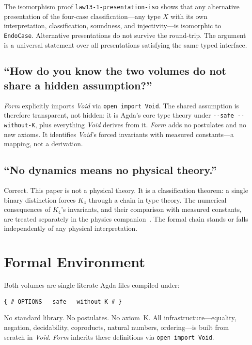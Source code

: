 \documentclass[11pt,a4paper]{article}
\theoremstyle{definition}
\begin{document}
The isomorphism proof \texttt{law13-1-presentation-iso} shows that any
alternative presentation of the four-case classification---any type $X$ with its
own interpretation, classification, soundness, and injectivity---is isomorphic
to \texttt{EndoCase}.  Alternative presentations do not survive the round-trip.
The argument is a universal statement over all presentations satisfying the
same typed interface.

\subsection*{``How do you know the two volumes do not share a hidden assumption?''}

\textit{Form} explicitly imports \textit{Void} via \texttt{open import Void}.
The shared assumption is therefore transparent, not hidden: it is
Agda's core type theory under \texttt{-{}-safe -{}-without-K}, plus
everything \textit{Void} derives from it.  \textit{Form} adds no postulates
and no new axioms.  It identifies \textit{Void}'s forced invariants with
measured constants---a mapping, not a derivation.

\subsection*{``No dynamics means no physical theory.''}

Correct.  This paper is not a physical theory.  It is a classification
theorem: a single binary distinction forces $K_4$ through a chain
in type theory.  The numerical consequences of $K_4$'s invariants, and their
comparison with measured constants, are treated separately in the physics
companion~\cite{wielsch2026physics}.  The formal chain stands or falls
independently of any physical interpretation.

\section{Formal Environment}
\label{sec:formal}

Both volumes are single literate Agda files compiled under:

\begin{lstlisting}
{-# OPTIONS --safe --without-K #-}
\end{lstlisting}

\noindent No standard library.  No postulates.  No axiom~K.  All
infrastructure---equality, negation, decidability, coproducts, natural
numbers, ordering---is built from scratch in \textit{Void}.
\textit{Form} inherits these definitions via \texttt{open import Void}.
\end{document}
